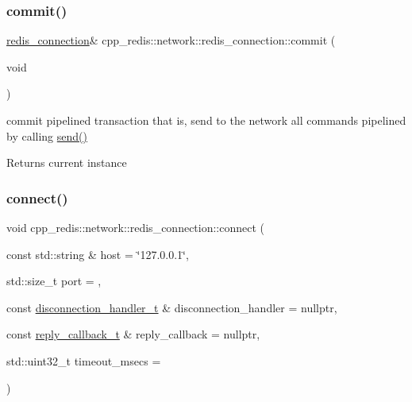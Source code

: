 \subsubsection{\texorpdfstring{commit()}{commit()}}
{\footnotesize\ttfamily \hyperlink{classcpp__redis_1_1network_1_1redis__connection}{redis\+\_\+connection}\& cpp\+\_\+redis\+::network\+::redis\+\_\+connection\+::commit (\begin{DoxyParamCaption}\item[{void}]{ }\end{DoxyParamCaption})}

commit pipelined transaction that is, send to the network all commands pipelined by calling \hyperlink{classcpp__redis_1_1network_1_1redis__connection_a98c163ce431e85e46e139211564b7b3f}{send()}

\begin{DoxyReturn}{Returns}
current instance 
\end{DoxyReturn}
\mbox{\label{classcpp__redis_1_1network_1_1redis__connection_af105573e46eadbc34a9f5907832df19f}} 
\subsubsection{\texorpdfstring{connect()}{connect()}}
{\footnotesize\ttfamily void cpp\+\_\+redis\+::network\+::redis\+\_\+connection\+::connect (\begin{DoxyParamCaption}\item[{const std\+::string \&}]{host = {\ttfamily \char`\"{}127.0.0.1\char`\"{}},  }\item[{std\+::size\+\_\+t}]{port = {},  }\item[{const \hyperlink{classcpp__redis_1_1network_1_1redis__connection_aba1a229a3d36a5540a80776ed0cf9a44}{disconnection\+\_\+handler\+\_\+t} \&}]{disconnection\+\_\+handler = {\ttfamily nullptr},  }\item[{const \hyperlink{classcpp__redis_1_1network_1_1redis__connection_a40f4b55a3103b7436e34211893377245}{reply\+\_\+callback\+\_\+t} \&}]{reply\+\_\+callback = {\ttfamily nullptr},  }\item[{std\+::uint32\+\_\+t}]{timeout\+\_\+msecs = {} }\end{DoxyParamCaption})}

